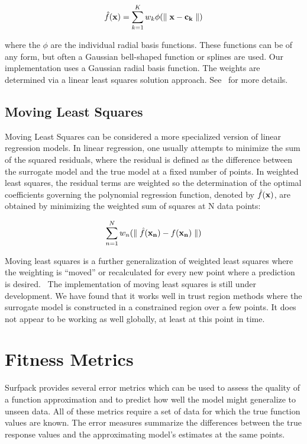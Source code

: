 \documentclass{article}
\begin{document}
\begin{equation}
  \hat{f}({\bf x})=\sum_{k=1}^{K}w_{k}\phi({\parallel {\bf x} - {\bf c_{k}} \parallel})
  \label{models:surf:equation11}  
\end{equation}

where the $\phi$ are the individual radial basis functions.  
These functions can be of any form, but often a Gaussian bell-shaped 
function or splines are used.  
Our implementation uses a Gaussian radial basis function. 
The weights are determined via a linear least squares solution approach.
See~\cite{orr} for more details.

\subsection{Moving Least Squares}\label{models:surf:mls}

Moving Least Squares can be considered a more specialized 
version of linear regression models.  In linear regression, 
one usually attempts to minimize the sum of the squared residuals, 
where the residual is defined as the difference between the 
surrogate model and the true model at a fixed number of points. 
In weighted least squares, the residual terms are weighted so the 
determination of the optimal coefficients governing the polynomial 
regression function, denoted by $\hat{f}({\bf x})$, are obtained by 
minimizing the weighted sum of squares at N data points: 

\begin{equation}
  \sum_{n=1}^{N}w_{n}({\parallel \hat{f}({\bf x_{n}})-f({\bf x_{n}})\parallel})
  \label{models:surf:equation12}  
\end{equation}

Moving least squares is a further generalization of weighted least squares
where the weighting is ``moved'' or recalculated for every new point where 
a prediction is desired.~\cite{nealen}  The implementation of 
moving least squares 
is still under development.  We have found that it works well 
in trust region methods where the surrogate model is constructed in 
a constrained region over a few points.  It does not appear to be working 
as well globally, at least at this point in time.

\section{Fitness Metrics}
Surfpack provides several error metrics which can be used to assess the quality of a function approximation and to predict how well the model might generalize to unseen data.  All of these metrics require a set of data for which the true function values are known.  The error measures summarize the differences between the true response values and the approximating model's estimates at the same points.
\end{document}

